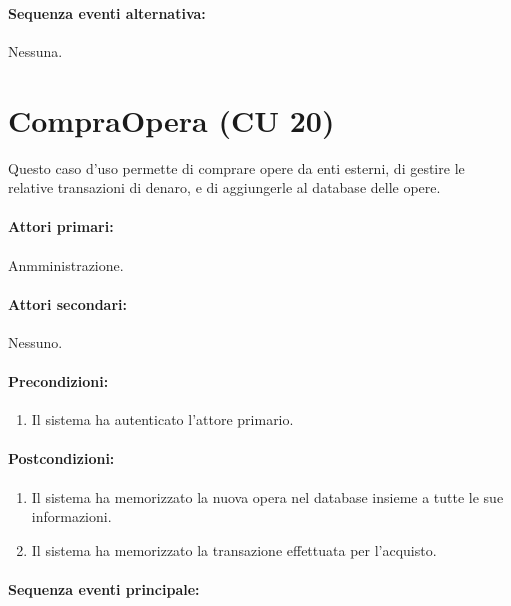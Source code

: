 \documentclass{article}
\begin{document}
	\paragraph{Sequenza eventi alternativa:}Nessuna. 






	

	
	
	
	
	\newpage 
	
	\section*{CompraOpera (CU 20)}
	
	\indent\indent Questo caso d'uso permette di comprare opere da enti esterni, di gestire le relative transazioni di denaro, e di aggiungerle al database delle opere.
	
	\paragraph{Attori primari:}Anmministrazione.
	
	\paragraph{Attori secondari:}Nessuno.
	
	\paragraph{Precondizioni:}
		\begin{enumerate}	[itemsep=8pt,parsep=0pt]
			\item Il sistema ha autenticato l'attore primario.
		\end{enumerate}
	
	\paragraph{Postcondizioni:}
		\begin{enumerate}[itemsep=8pt,parsep=0pt]
			\item Il sistema ha memorizzato la nuova opera nel database insieme a tutte le sue informazioni.
			\item Il sistema ha memorizzato la transazione effettuata per l'acquisto.
		\end{enumerate}
	
	\paragraph{Sequenza eventi principale:}
\end{document}
